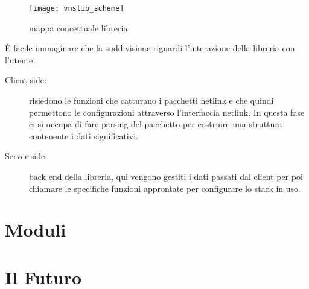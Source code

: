 \begin{figure}[h]                       %
\begin{center}                          %
\texttt{[image: vnslib\_scheme]}%
%
\caption[mappa concettuale libreria]{mappa concettuale libreria}\label{fig:map}
\end{center}
\end{figure}
\`E facile immaginare che la suddivisione riguardi l'interazione della libreria con l'utente.
\begin{description}                     %
  \item[Client-side:] risiedono le funzioni che catturano i pacchetti netlink e che quindi permettono le configurazioni attraverso l'interfaccia netlink. In questa fase ci si occupa di fare parsing del pacchetto per costruire una struttura contenente i dati significativi.
  \item[Server-side:] back end della libreria, qui vengono gestiti i dati passati dal client per poi chiamare le specifiche funzioni approntate per configurare lo stack in uso.
\end{description}

\section{Moduli}
\section{Il Futuro}
\clearpage{\pagestyle{empty}\cleardoublepage} 
